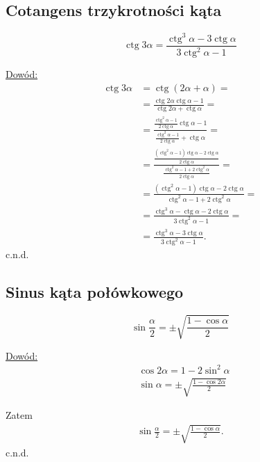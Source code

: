 \documentclass[12pt,a4paper,fleqn]{article}
\DeclareMathOperator{\ctg}{ctg}
\begin{document}
	\subsection{Cotangens trzykrotności kąta}
		\begin{equation*}
			\ctg3\alpha = \frac{\ctg^3\alpha - 3\ctg\alpha}{3\ctg^2\alpha-1}
		\end{equation*}
		
		\underline{Dowód:} \noindent
		\begin{align*}
			\ctg3\alpha &= \ctg(2\alpha + \alpha) = \\
					    &= \frac{\ctg2\alpha\ctg\alpha- 1}{\ctg2\alpha+\ctg\alpha} = \\
					   	&= \frac{\frac{\ctg^2\alpha-1}{2\ctg\alpha}\ctg\alpha- 1}{\frac{\ctg^2\alpha-1}{2\ctg\alpha}+\ctg\alpha} = \\
					   	&= \frac{\frac{(\ctg^2\alpha-1)\ctg\alpha-2\ctg\alpha}{2\ctg\alpha}}{\frac{\ctg^2\alpha-1+2\ctg^2\alpha}{2\ctg\alpha}} =\\
					   	&=\frac{(\ctg^2\alpha-1)\ctg\alpha-2\ctg\alpha}{\ctg^2\alpha-1+2\ctg^2\alpha} =\\
					   	&=\frac{\ctg^3\alpha-\ctg\alpha-2\ctg\alpha}{3\ctg^2\alpha-1} =\\
					   	&= \frac{\ctg^3\alpha - 3\ctg\alpha}{3\ctg^2\alpha-1}.
		\end{align*}
		c.n.d.

	\subsection{Sinus kąta połówkowego}
		\begin{equation*}
			\sin\frac{\alpha}{2} = \pm \sqrt{\frac{1-\cos\alpha}{2}}
		\end{equation*}
		
		\underline{Dowód:} \noindent
		\begin{align*}
			&\cos 2\alpha = 1 - 2\sin^2\alpha\\
			&\sin\alpha = \pm \sqrt{\frac{1-\cos2\alpha}{2}}
		\end{align*}
		
		Zatem
		\begin{align*}
			\sin\frac{\alpha}{2} = \pm \sqrt{\frac{1-\cos\alpha}{2}}.
		\end{align*}
		c.n.d.
		
\end{document}
